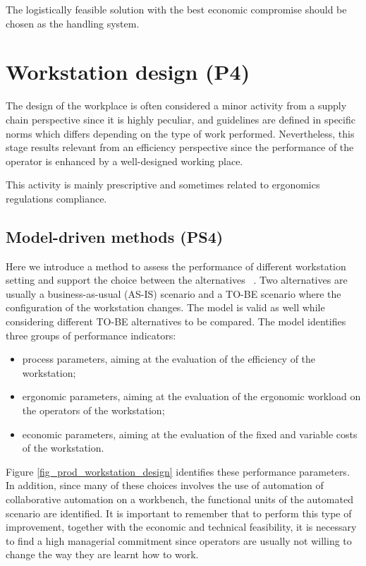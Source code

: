 The logistically feasible solution with the best economic compromise should be chosen as the handling system.

\section{Workstation design (P4)}
The design of the workplace is often considered a minor activity from a supply chain perspective since it is highly peculiar, and guidelines are defined in specific norms which differs depending on the type of work performed. Nevertheless, this stage results relevant from an efficiency perspective since the performance of the operator is enhanced by a well-designed working place.\par

This activity is mainly prescriptive and sometimes related to ergonomics regulations compliance. 

\subsection{Model-driven methods (PS4)}
Here we introduce a method to assess the performance of different workstation setting and support the choice between the alternatives ~\cite{Accorsi2019_cobot}. Two alternatives are usually a business-as-usual (AS-IS) scenario and a TO-BE scenario where the configuration of the workstation changes. The model is valid as well while considering different TO-BE alternatives to be compared. The model identifies three groups of performance indicators:

\begin{itemize}
    \item process parameters, aiming at the evaluation of the efficiency of the workstation;
    \item ergonomic parameters, aiming at the evaluation of the ergonomic workload on the operators of the workstation;
    \item economic parameters, aiming at the evaluation of the fixed and variable costs of the workstation.

\end{itemize}

Figure \ref{fig_prod_workstation_design} identifies these performance parameters. In addition, since many of these choices involves the use of automation of collaborative automation on a workbench, the functional units of the automated scenario are identified. It is important to remember that to perform this type of improvement, together with the economic and technical feasibility, it is necessary to find a high managerial commitment since operators are usually not willing to change the way they are learnt how to work.

